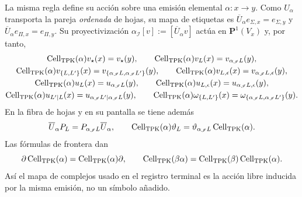 La misma regla define su acción sobre una emisión elemental
\(\alpha:x\to y\). Como \(U_\alpha\) transporta la pareja \emph{ordenada}
de hojas, su mapa de etiquetas es
\(\overline U_\alpha e_{\Sigma,x}=e_{\Sigma,y}\) y
\(\overline U_\alpha e_{\Pi,x}=e_{\Pi,y}\). Su proyectivización
\(\alpha_{\mathscr I}[v]:=[\overline U_\alpha v]\) actúa en
\(\mathbf P^1(V_x)\) y, por tanto,
\begin{equation}
\label{eq:pdfv2-cor-cell-accion-emision}
 \begin{gathered}
 \operatorname{Cell}_{\rm TPK}(\alpha)v_\star(x)=v_\star(y),\qquad
 \operatorname{Cell}_{\rm TPK}(\alpha)v_L(x)
   =v_{\alpha_{\mathscr I}L}(y),\\
 \operatorname{Cell}_{\rm TPK}(\alpha)v_{\{L,L'\}}(x)
   =v_{\{\alpha_{\mathscr I}L,\alpha_{\mathscr I}L'\}}(y),\qquad
 \operatorname{Cell}_{\rm TPK}(\alpha)v_{L,\epsilon}(x)
   =v_{\alpha_{\mathscr I}L,\epsilon}(y),\\
 \operatorname{Cell}_{\rm TPK}(\alpha)u_L(x)
   =u_{\alpha_{\mathscr I}L}(y),\qquad
 \operatorname{Cell}_{\rm TPK}(\alpha)u_{L,\epsilon}(x)
   =u_{\alpha_{\mathscr I}L,\epsilon}(y),\\
 \operatorname{Cell}_{\rm TPK}(\alpha)u_{L'\mid L}(x)
   =u_{\alpha_{\mathscr I}L'\mid\alpha_{\mathscr I}L}(y),\qquad
 \operatorname{Cell}_{\rm TPK}(\alpha)\omega_{\{L,L'\}}(x)
   =\omega_{\{\alpha_{\mathscr I}L,
                 \alpha_{\mathscr I}L'\}}(y).
 \end{gathered}
\end{equation}
En la fibra de hojas y en su pantalla se tiene además
\begin{equation}
\label{eq:pdfv2-cor-cell-entrelaza-proyectores-pantalla}
 \overline U_\alpha P_L=P_{\alpha_{\mathscr I}L}\overline U_\alpha,
 \qquad
 \operatorname{Cell}_{\rm TPK}(\alpha)\vartheta_L
 =\vartheta_{\alpha_{\mathscr I}L}
  \operatorname{Cell}_{\rm TPK}(\alpha).
\end{equation}
Las fórmulas de frontera dan
\begin{equation}
\label{eq:pdfv2-cor-cell-accion-emision-natural}
 \partial\operatorname{Cell}_{\rm TPK}(\alpha)
 =\operatorname{Cell}_{\rm TPK}(\alpha)\partial,\qquad
 \operatorname{Cell}_{\rm TPK}(\beta\alpha)
 =\operatorname{Cell}_{\rm TPK}(\beta)
  \operatorname{Cell}_{\rm TPK}(\alpha).
\end{equation}
Así el mapa de complejos usado en el registro terminal es la acción libre
inducida por la misma emisión, no un símbolo añadido.

